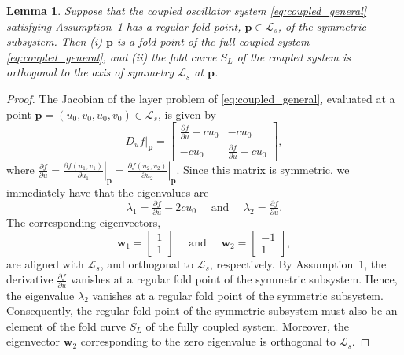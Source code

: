 \documentclass[10pt,onecolumn]{article}
\newcommand{\RED}[1]{{\color{red}{#1}}}
\theoremstyle{plain}
\newtheorem{lemma}{Lemma}[section]
\begin{document}
\begin{lemma} \label{lemma:orthogonality}
Suppose that the coupled oscillator system \eqref{eq:coupled_general} satisfying Assumption~1 has a regular fold point, $\boldsymbol p \in \mathcal L_s$, of the symmetric subsystem. Then (i) $\boldsymbol p$ is a fold point of the full coupled system \eqref{eq:coupled_general}, and (ii) the fold curve $S_L$ of the coupled system is orthogonal to the axis of symmetry $\mathcal L_s$ at $\boldsymbol p$. 
\end{lemma}

\begin{proof}
The Jacobian of the layer problem of \eqref{eq:coupled_general}, evaluated at a point $\boldsymbol p = (u_0,v_0,u_0,v_0) \in \mathcal L_s$, is given by 
%
\[ \left. D_u f \right|_{\boldsymbol p} = \begin{bmatrix} \tfrac{\partial f}{\partial u} - c u_0 & -c u_0 \\ -c u_0 & \tfrac{\partial f}{\partial u} - c u_0 \end{bmatrix}, \]
%
where $\tfrac{\partial f}{\partial u} = \left. \tfrac{\partial f(u_1,v_1)}{\partial u_1} \right|_{\boldsymbol p} = \left. \tfrac{\partial f(u_2,v_2)}{\partial u_2} \right|_{\boldsymbol p}$. Since this matrix is symmetric, we immediately have that the eigenvalues are  
%
\[ \lambda_1 = \tfrac{\partial f}{\partial u} - 2 c u_0 \quad \text{ and } \quad \lambda_2 = \tfrac{\partial f}{\partial u}. \]
%
The corresponding eigenvectors, 
%
\[ \boldsymbol w_1 = \begin{bmatrix} 1 \\ 1 \end{bmatrix} \quad \text{ and } \quad \boldsymbol w_2 = \begin{bmatrix} -1 \\ 1 \end{bmatrix},\]
%
are aligned with $\mathcal L_s$, and orthogonal to $\mathcal L_s$, respectively. 
By Assumption~1, the derivative $\tfrac{\partial f}{\partial u}$ vanishes at a regular fold point of the symmetric subsystem. Hence, the eigenvalue $\lambda_2$ vanishes at a regular fold point of the symmetric subsystem. Consequently, the regular fold point of the symmetric subsystem must also be an element of the fold curve $S_L$ of the fully coupled system. Moreover, the eigenvector $\boldsymbol w_2$ corresponding to the zero eigenvalue is orthogonal to $\mathcal L_s$. 
\end{proof}
\end{document}

